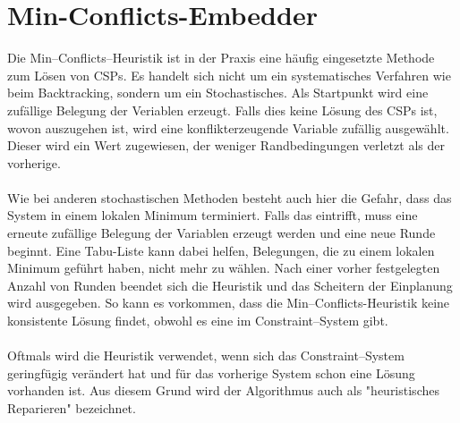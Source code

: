 \section{Min-Conflicts-Embedder}
Die Min--Conflicts--Heuristik ist in der Praxis eine häufig eingesetzte Methode zum Lösen von CSPs. Es handelt sich nicht um ein systematisches Verfahren wie beim Backtracking, sondern um ein Stochastisches. Als Startpunkt wird eine zufällige Belegung der Veriablen erzeugt. Falls dies keine Lösung des CSPs ist, wovon auszugehen ist, wird eine konflikterzeugende Variable zufällig ausgewählt. Dieser wird ein Wert zugewiesen, der weniger Randbedingungen verletzt als der vorherige.\\ \\
Wie bei anderen stochastischen Methoden besteht auch hier die Gefahr, dass das System in einem lokalen Minimum terminiert. Falls das eintrifft, muss eine erneute zufällige Belegung der Variablen erzeugt werden und eine neue Runde beginnt. Eine Tabu-Liste kann dabei helfen, Belegungen, die zu einem lokalen Minimum geführt haben, nicht mehr zu wählen. Nach einer vorher festgelegten Anzahl von Runden beendet sich die Heuristik und das Scheitern der Einplanung wird ausgegeben. So kann es vorkommen, dass die Min--Conflicts-Heuristik keine konsistente Lösung findet, obwohl es eine im Constraint--System gibt.\\ \\
Oftmals wird die Heuristik verwendet, wenn sich das Constraint--System geringfügig verändert hat und für das vorherige System schon eine Lösung vorhanden ist. Aus diesem Grund wird der Algorithmus auch als "heuristisches Reparieren" \cite{cspsolvingRepairMethod} bezeichnet.\\ \\
